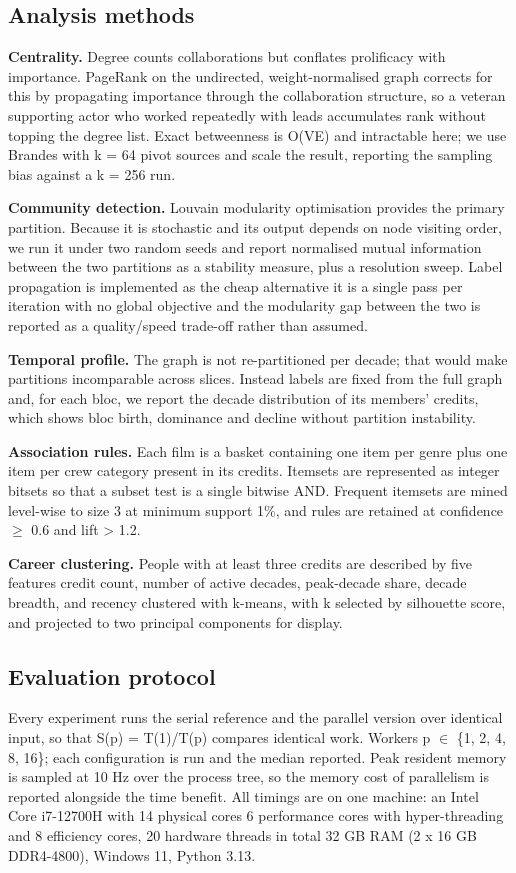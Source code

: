 \subsection{Analysis methods}

\textbf{Centrality.} Degree counts collaborations but conflates prolificacy with importance. PageRank on the undirected, weight-normalised graph corrects for this by propagating importance through the collaboration structure, so a veteran supporting actor who worked repeatedly with leads accumulates rank without topping the degree list. Exact betweenness is O(VE) and intractable here; we use Brandes with k = 64 pivot sources and scale the result, reporting the sampling bias against a k = 256 run.

\textbf{Community detection.} Louvain modularity optimisation provides the primary partition. Because it is stochastic and its output depends on node visiting order, we run it under two random seeds and report normalised mutual information between the two partitions as a stability measure, plus a resolution sweep. Label propagation is implemented as the cheap alternative \textemdash{} it is a single pass per iteration with no global objective \textemdash{} and the modularity gap between the two is reported as a quality/speed trade-off rather than assumed.

\textbf{Temporal profile.} The graph is not re-partitioned per decade; that would make partitions incomparable across slices. Instead labels are fixed from the full graph and, for each bloc, we report the decade distribution of its members' credits, which shows bloc birth, dominance and decline without partition instability.

\textbf{Association rules.} Each film is a basket containing one item per genre plus one item per crew category present in its credits. Itemsets are represented as integer bitsets so that a subset test is a single bitwise AND. Frequent itemsets are mined level-wise to size 3 at minimum support 1\%, and rules are retained at confidence $\geq$ 0.6 and lift > 1.2.

\textbf{Career clustering.} People with at least three credits are described by five features \textemdash{} credit count, number of active decades, peak-decade share, decade breadth, and recency \textemdash{} clustered with k-means, with k selected by silhouette score, and projected to two principal components for display.

\subsection{Evaluation protocol}

Every experiment runs the serial reference and the parallel version over identical input, so that S(p) = T(1)/T(p) compares identical work. Workers p $\in$ \{1, 2, 4, 8, 16\}; each configuration is run and the median reported. Peak resident memory is sampled at 10 Hz over the process tree, so the memory cost of parallelism is reported alongside the time benefit. All timings are on one machine: an Intel Core i7-12700H with 14 physical cores \textemdash{} 6 performance cores with hyper-threading and 8 efficiency cores, 20 hardware threads in total \textemdash{} 32 GB RAM (2 x 16 GB DDR4-4800), Windows 11, Python 3.13.
